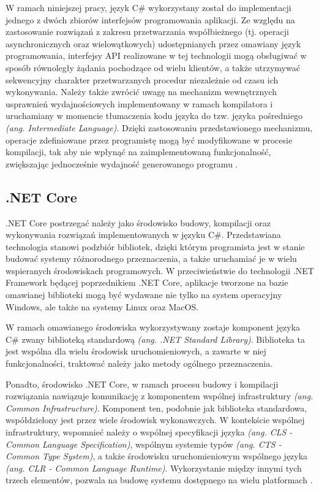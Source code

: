 W ramach niniejszej pracy, język C\# wykorzystany został do implementacji jednego z dwóch zbiorów interfejsów programowania aplikacji. Ze względu na zastosowanie rozwiązań z zakresu przetwarzania współbieżnego (tj. operacji asynchronicznych oraz wielowątkowych) udostępnianych przez omawiany język programowania, interfejsy API realizowane w tej technologii mogą obsługiwać w sposób równoległy żądania pochodzące od wielu klientów, a także utrzymywać sekwencyjny charakter przetwarzanych procedur niezależnie od czasu ich wykonywania. Należy także zwrócić uwagę na mechanizm wewnętrznych usprawnień wydajnościowych implementowany w ramach kompilatora i uruchamiany w momencie tłumaczenia kodu języka do tzw. języka pośredniego \textit{(ang. Intermediate Language)}. Dzięki zastosowaniu przedstawionego mechanizmu, operacje zdefiniowane przez programistę mogą być modyfikowane w procesie kompilacji, tak aby nie wpłynąć na zaimplementowaną funkcjonalność, zwiększając jednocześnie wydajność generowanego programu \cite{hejlsberg2003c}.
\subsection*{.NET Core}
.NET Core postrzegać należy jako środowisko budowy, kompilacji oraz wykonywania rozwiązań implementowanych w języku C\#. Przedstawiana technologia stanowi podzbiór bibliotek, dzięki którym programista jest w stanie budować systemy różnorodnego przeznaczenia, a także uruchamiać je w wielu wspieranych środowiskach programowych. W przeciwieństwie do technologii .NET Framework będącej poprzednikiem .NET Core, aplikacje tworzone na bazie omawianej biblioteki mogą być wydawane nie tylko na system operacyjny Windows, ale także na systemy Linux oraz MacOS.

W ramach omawianego środowiska wykorzystywany zostaje komponent języka C\# zwany biblioteką standardową \textit{(ang. .NET Standard Library)}. Biblioteka ta jest wspólna dla wielu środowisk uruchomieniowych, a zawarte w niej funkcjonalności, traktować należy jako metody ogólnego przeznaczenia.

Ponadto, środowisko .NET Core, w ramach procesu budowy i kompilacji rozwiązania nawiązuje komunikację z komponentem wspólnej infrastruktury \textit{(ang. Common Infrastructure)}. Komponent ten, podobnie jak biblioteka standardowa, współdzielony jest przez wiele środowisk wykonawczych. W kontekście wspólnej infrastruktury, wspomnieć należy o wspólnej specyfikacji języka \textit{(ang. CLS - Common Language Specification)}, wspólnym systemie typów \textit{(ang. CTS - Common Type System)}, a także środowisku uruchomieniowym wspólnego języka \textit{(ang. CLR - Common Language Runtime)}. Wykorzystanie między innymi tych trzech elementów, pozwala na budowę systemu dostępnego na wielu platformach \cite{troelsen2017pro}.

